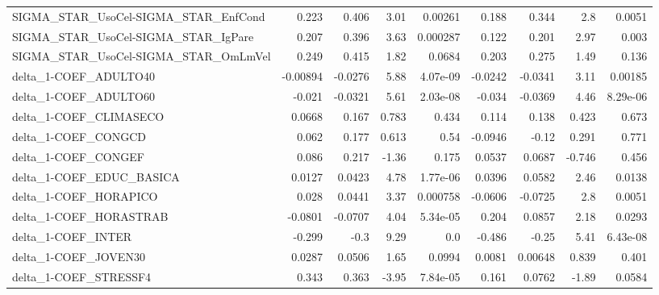 \begin{tabular}{lrrrrrrrr}
SIGMA\_STAR\_UsoCel-SIGMA\_STAR\_EnfCond  &       0.223 &        0.406 &     3.01 &  0.00261 &      0.188 &       0.344 &          2.8 &        0.0051 \\
SIGMA\_STAR\_UsoCel-SIGMA\_STAR\_IgPare   &       0.207 &        0.396 &     3.63 & 0.000287 &      0.122 &       0.201 &         2.97 &         0.003 \\
SIGMA\_STAR\_UsoCel-SIGMA\_STAR\_OmLmVel  &       0.249 &        0.415 &     1.82 &   0.0684 &      0.203 &       0.275 &         1.49 &         0.136 \\
delta\_1-COEF\_ADULTO40                 &    -0.00894 &      -0.0276 &     5.88 & 4.07e-09 &    -0.0242 &     -0.0341 &         3.11 &       0.00185 \\
delta\_1-COEF\_ADULTO60                 &      -0.021 &      -0.0321 &     5.61 & 2.03e-08 &     -0.034 &     -0.0369 &         4.46 &      8.29e-06 \\
delta\_1-COEF\_CLIMASECO                &      0.0668 &        0.167 &    0.783 &    0.434 &      0.114 &       0.138 &        0.423 &         0.673 \\
delta\_1-COEF\_CONGCD                   &       0.062 &        0.177 &    0.613 &     0.54 &    -0.0946 &       -0.12 &        0.291 &         0.771 \\
delta\_1-COEF\_CONGEF                   &       0.086 &        0.217 &    -1.36 &    0.175 &     0.0537 &      0.0687 &       -0.746 &         0.456 \\
delta\_1-COEF\_EDUC\_BASICA              &      0.0127 &       0.0423 &     4.78 & 1.77e-06 &     0.0396 &      0.0582 &         2.46 &        0.0138 \\
delta\_1-COEF\_HORAPICO                 &       0.028 &       0.0441 &     3.37 & 0.000758 &    -0.0606 &     -0.0725 &          2.8 &        0.0051 \\
delta\_1-COEF\_HORASTRAB                &     -0.0801 &      -0.0707 &     4.04 & 5.34e-05 &      0.204 &      0.0857 &         2.18 &        0.0293 \\
delta\_1-COEF\_INTER                    &      -0.299 &         -0.3 &     9.29 &      0.0 &     -0.486 &       -0.25 &         5.41 &      6.43e-08 \\
delta\_1-COEF\_JOVEN30                  &      0.0287 &       0.0506 &     1.65 &   0.0994 &     0.0081 &     0.00648 &        0.839 &         0.401 \\
delta\_1-COEF\_STRESSF4                 &       0.343 &        0.363 &    -3.95 & 7.84e-05 &      0.161 &      0.0762 &        -1.89 &        0.0584 \\

\end{tabular}
